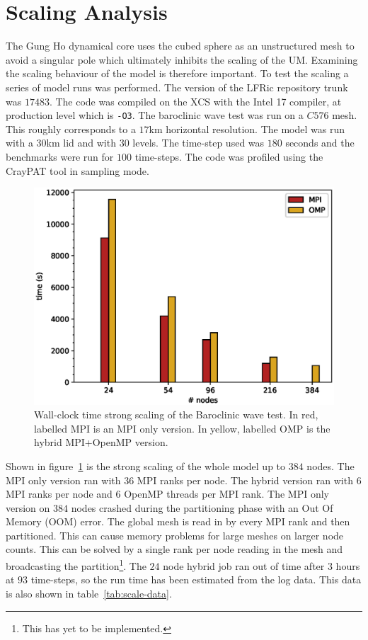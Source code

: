 \section{\label{sec:scale}Scaling Analysis}
The Gung Ho dynamical core uses the cubed sphere as an unstructured
mesh to avoid a singular pole which ultimately inhibits the scaling of
the UM. Examining the scaling behaviour of the model is therefore
important. To test the scaling a series of model runs was
performed. The version of the LFRic repository trunk was $17483$. The
code was compiled on the XCS with the Intel 17 compiler, at production
level which is \verb+-O3+. The baroclinic wave test was run on a
$C576$ mesh. This roughly corresponds to a $17$km horizontal
resolution. The model was run with a $30$km lid and with $30$ levels.
The time-step used was $180$ seconds and the benchmarks were run for
$100$ time-steps. The code was profiled using the CrayPAT tool in
sampling mode.

\begin{figure}
\centering\includegraphics[width=1.0\linewidth]{figs/wc-scale.eps}
\caption{\label{fig:wc_scale}Wall-clock time strong scaling of the 
  Baroclinic wave test. In red, labelled MPI is an MPI only
  version. In yellow, labelled OMP is the hybrid MPI+OpenMP version.}
\end{figure} 

Shown in figure~\ref{fig:wc_scale} is the strong scaling of the whole
model up to $384$ nodes. The MPI only version ran with $36$ MPI ranks
per node. The hybrid version ran with $6$ MPI ranks per node and $6$
OpenMP threads per MPI rank. The MPI only version on $384$ nodes
crashed during the partitioning phase with an Out Of Memory (OOM)
error. The global mesh is read in by every MPI rank and then
partitioned. This can cause memory problems for large meshes on larger
node counts. This can be solved by a single rank per node reading in
the mesh and broadcasting the partition\footnote{This has yet to be
  implemented.}. The $24$ node hybrid job ran out of time after 3
hours at $93$ time-steps, so the run time has been estimated from the
log data. This data is also shown in table~\ref{tab:scale-data}.

